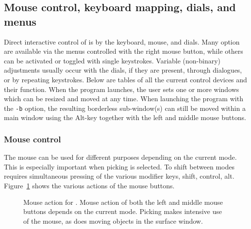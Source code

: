 
\subsection{Mouse control, keyboard mapping, dials, and menus}
 
Direct interactive control of \map{} is by the keyboard, mouse, and dials.
Many option are available via the menus controlled with the right mouse
button, while others can be activated or toggled with single keystrokes.
Variable (non-binary) adjustments usually occur with the dials, if they are
present, through dialogues, or by repeating keystrokes.  Below are tables
of all the current control devices and their function.  When the program
launches, the user sets one or more windows which can be resized and moved
at any time.  When launching the program with the {\tt -b} option, the
resulting borderless sub-window(s) can still be moved within a main window
using the Alt-key together with the left and middle mouse buttons.


\subsubsection{Mouse control}


The mouse can be used for different purposes depending on the current mode.
This is especially important when picking is selected.  To shift between
modes requires simultaneous pressing of the various modifier keys, shift,
control, alt. Figure~\ref{fig:mouse} shows the various actions of the mouse
buttons. 

\begin{figure}[htb]
  \centerline{}
  \caption{\label{fig:mouse} Mouse action for \map{}.  Mouse action of both
  the left and middle mouse buttons depends on the current mode.  Picking
  makes intensive use of the mouse, as does moving objects in the surface
  window.}
  
\end{figure}

